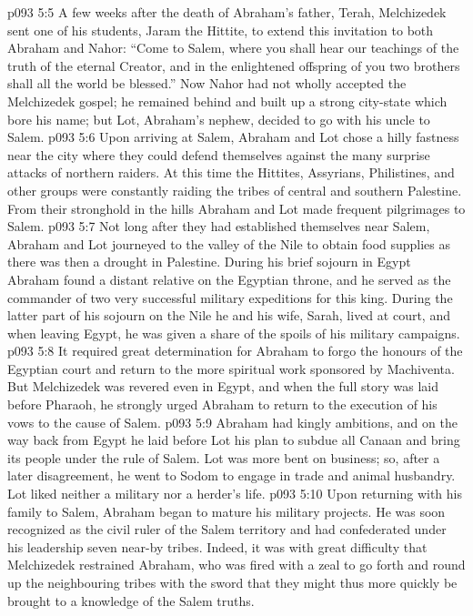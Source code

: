 \vs p093 5:5 A few weeks after the death of Abraham’s father, Terah, Melchizedek sent one of his students, Jaram the Hittite, to extend this invitation to both Abraham and Nahor: “Come to Salem, where you shall hear our teachings of the truth of the eternal Creator, and in the enlightened offspring of you two brothers shall all the world be blessed.” Now Nahor had not wholly accepted the Melchizedek gospel; he remained behind and built up a strong city\hyp{}state which bore his name; but Lot, Abraham’s nephew, decided to go with his uncle to Salem.
\vs p093 5:6 Upon arriving at Salem, Abraham and Lot chose a hilly fastness near the city where they could defend themselves against the many surprise attacks of northern raiders. At this time the Hittites, Assyrians, Philistines, and other groups were constantly raiding the tribes of central and southern Palestine. From their stronghold in the hills Abraham and Lot made frequent pilgrimages to Salem.
\vs p093 5:7 \pc Not long after they had established themselves near Salem, Abraham and Lot journeyed to the valley of the Nile to obtain food supplies as there was then a drought in Palestine. During his brief sojourn in Egypt Abraham found a distant relative on the Egyptian throne, and he served as the commander of two very successful military expeditions for this king. During the latter part of his sojourn on the Nile he and his wife, Sarah, lived at court, and when leaving Egypt, he was given a share of the spoils of his military campaigns.
\vs p093 5:8 It required great determination for Abraham to forgo the honours of the Egyptian court and return to the more spiritual work sponsored by Machiventa. But Melchizedek was revered even in Egypt, and when the full story was laid before Pharaoh, he strongly urged Abraham to return to the execution of his vows to the cause of Salem.
\vs p093 5:9 \pc Abraham had kingly ambitions, and on the way back from Egypt he laid before Lot his plan to subdue all Canaan and bring its people under the rule of Salem. Lot was more bent on business; so, after a later disagreement, he went to Sodom to engage in trade and animal husbandry. Lot liked neither a military nor a herder’s life.
\vs p093 5:10 Upon returning with his family to Salem, Abraham began to mature his military projects. He was soon recognized as the civil ruler of the Salem territory and had confederated under his leadership seven near\hyp{}by tribes. Indeed, it was with great difficulty that Melchizedek restrained Abraham, who was fired with a zeal to go forth and round up the neighbouring tribes with the sword that they might thus more quickly be brought to a knowledge of the Salem truths.
